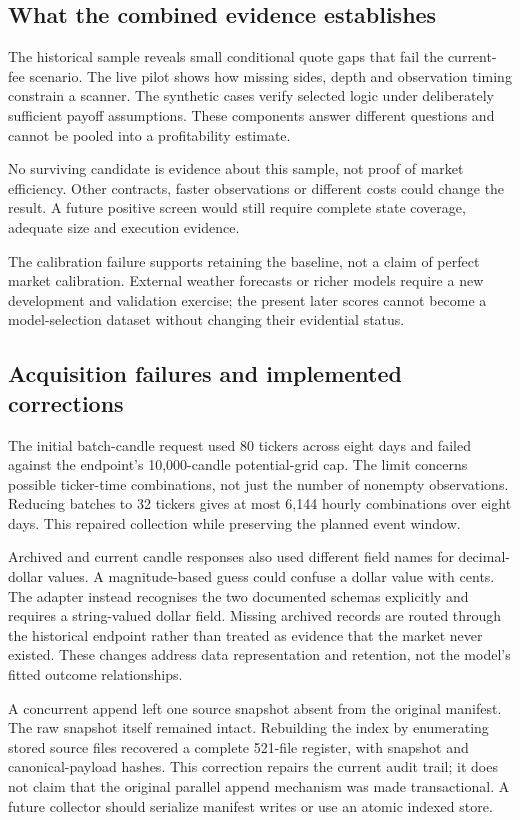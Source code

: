 \subsection{What the combined evidence establishes}
The historical sample reveals small conditional quote gaps that fail the current-fee scenario. The live pilot shows how missing sides, depth and observation timing constrain a scanner. The synthetic cases verify selected logic under deliberately sufficient payoff assumptions. These components answer different questions and cannot be pooled into a profitability estimate.

No surviving candidate is evidence about this sample, not proof of market efficiency. Other contracts, faster observations or different costs could change the result. A future positive screen would still require complete state coverage, adequate size and execution evidence.

The calibration failure supports retaining the baseline, not a claim of perfect market calibration. External weather forecasts or richer models require a new development and validation exercise; the present later scores cannot become a model-selection dataset without changing their evidential status.

\subsection{Acquisition failures and implemented corrections}
The initial batch-candle request used 80 tickers across eight days and failed against the endpoint's 10,000-candle potential-grid cap. The limit concerns possible ticker-time combinations, not just the number of nonempty observations. Reducing batches to 32 tickers gives at most 6,144 hourly combinations over eight days. This repaired collection while preserving the planned event window.

Archived and current candle responses also used different field names for decimal-dollar values. A magnitude-based guess could confuse a dollar value with cents. The adapter instead recognises the two documented schemas explicitly and requires a string-valued dollar field. Missing archived records are routed through the historical endpoint rather than treated as evidence that the market never existed. These changes address data representation and retention, not the model's fitted outcome relationships.

A concurrent append left one source snapshot absent from the original manifest. The raw snapshot itself remained intact. Rebuilding the index by enumerating stored source files recovered a complete 521-file register, with snapshot and canonical-payload hashes. This correction repairs the current audit trail; it does not claim that the original parallel append mechanism was made transactional. A future collector should serialize manifest writes or use an atomic indexed store.

